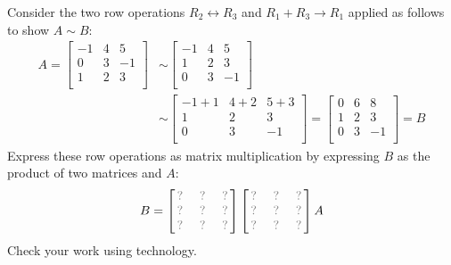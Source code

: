 \begin{activity}{10}
Consider the two row operations 
\(R_2\leftrightarrow R_3\) and \(R_1+R_3\to R_1\)
applied as follows to show \(A\sim B\):
\begin{align*}
A
  =
\begin{bmatrix}
-1&4&5\\
0&3&-1\\
1&2&3\\
\end{bmatrix}
  &\sim
\begin{bmatrix}
-1&4&5\\
1&2&3\\
0&3&-1\\
\end{bmatrix}
  \\&\sim
\begin{bmatrix}
-1+1&4+2&5+3\\
1&2&3\\
0&3&-1\\
\end{bmatrix}
  =
\begin{bmatrix}
0&6&8\\
1&2&3\\
0&3&-1\\
\end{bmatrix}
  = 
B
\end{align*}
Express these row operations as matrix multiplication
by expressing \(B\) as the product of two matrices and \(A\):
\[
B =
\begin{bmatrix}
\unknown&\unknown&\unknown\\
\unknown&\unknown&\unknown\\
\unknown&\unknown&\unknown
\end{bmatrix}
\begin{bmatrix}
\unknown&\unknown&\unknown\\
\unknown&\unknown&\unknown\\
\unknown&\unknown&\unknown
\end{bmatrix}
A
\]
Check your work using technology.
\end{activity}




